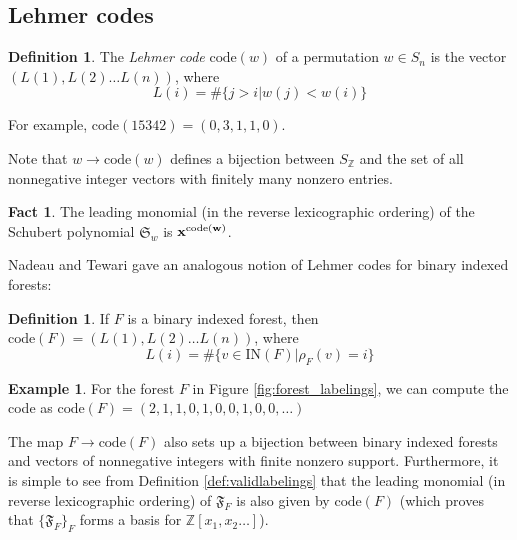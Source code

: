 \documentclass{article}
\theoremstyle{definition} %
\newtheorem{example}[theorem]{Example}
\newtheorem{definition}[theorem]{Definition}
\newtheorem{fact}[theorem]{Fact}
\begin{document}
\subsection{Lehmer codes}

\begin{definition}
    The \textit{Lehmer code} $\text{code}(w)$ of a permutation $w \in S_n$ is the vector $(L(1), L(2) \dots L(n))$, where 
    \[L(i) = \#\{j > i| w(j) < w(i)\}\]
\end{definition}

For example, $\text{code}(15342) = (0, 3, 1, 1, 0)$. 

Note that $w \to \text{code}(w)$ defines a bijection between $S_{\mathbb{Z}}$ and the set of all nonnegative integer vectors with finitely many nonzero entries. 
\vspace{1em}

\begin{fact}
    The leading monomial (in the reverse lexicographic ordering) of the Schubert polynomial $\mathfrak{S}_w$ is $\bf{x}^{\text{code}(w)}$.  
\end{fact}

Nadeau and Tewari gave an analogous notion of Lehmer codes for binary indexed forests: 
\vspace{1em}

\begin{definition}\label{def:lehmercodeforests}
    If $F$ is a binary indexed forest, then $\text{code}(F) = (L(1), L(2) \dots L(n))$, where 
    \[L(i) = \#\{v \in \text{IN}(F)| \rho_F(v) = i\}\]
\end{definition}
\vspace{1em}

\begin{example}

For the forest $F$ in Figure \ref{fig:forest_labelings}, we can compute the code as $\text{code}(F)=(2,1,1,0,1,0,0,1,0,0,\dots)$


\end{example}

The map $F \to \text{code}(F)$ also sets up a bijection between binary indexed forests and vectors of nonnegative integers with finite nonzero support. Furthermore, it is simple to see from Definition \ref{def:validlabelings} that the leading monomial (in reverse lexicographic ordering) of $\mathfrak{F}_F$ is also given by $\text{code}(F)$ (which proves that $\{\mathfrak{F}_F\}_F$ forms a basis for $\mathbb{Z}[x_1, x_2 \dots]$). 
\vspace{1em}
\end{document}
